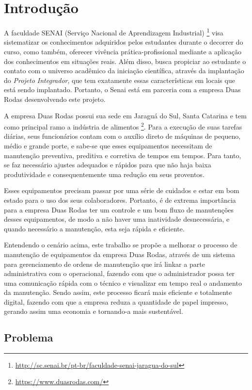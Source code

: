 \chapter{Introdução}

{A faculdade SENAI (Serviço Nacional de Aprendizagem Industrial) \footnote{\url{http://sc.senai.br/pt-br/faculdade-senai-jaragua-do-sul}}  visa sistematizar os conhecimentos adquiridos pelos estudantes durante o decorrer do curso, como também, oferecer vivência  prática-profissional mediante a aplicação dos conhecimentos em situações reais. Além disso, busca  propiciar ao estudante o contato com o universo acadêmico da iniciação científica, através da implantação do \textit{Projeto Integrador}, que tem exatamente essas características em locais que está sendo implantado. Portanto, o Senai está em parceria com a empresa Duas Rodas desenvolvendo este projeto. }

A empresa Duas Rodas possui sua sede em Jaraguá do Sul, Santa Catarina e tem como principal ramo a indústria de alimentos \footnote{\url{ https://www.duasrodas.com/}}. Para a execução de suas tarefas diárias, seus funcionários contam com o auxílio direto de máquinas de pequeno, médio e grande porte, e sabe-se que esses equipamentos necessitam de manutenção preventiva, preditiva e corretiva  de tempos em tempos. Para tanto, se faz necessário ajustes adequados e rápidos para que não haja baixa produtividade e consequentemente uma redução em seus proventos.

Esses equipamentos precisam passar por uma série de cuidados e estar em bom estado para o uso dos seus colaboradores. Portanto, é de extrema importância para a empresa Duas Rodas ter um controle e um bom fluxo de manutenções desses equipamentos, de modo a não haver uma inatividade desnecessária, e quando necessário a manutenção, esta seja rápida e eficiente.

Entendendo o cenário acima, este trabalho se propõe a melhorar o processo de manutenção de equipamentos da empresa Duas Rodas, através de um sistema para gerenciamento de ordens de manutenção que irá linkar a parte administrativa com o operacional, fazendo com que o administrador possa ter uma comunicação rápida com o técnico e visualizar em tempo real o andamento da manutenção. Sendo assim, este processo ficará mais eficiente e totalmente digital, fazendo com que a empresa reduza a quantidade de papel impresso, gerando assim uma economia e tornando-a mais sustentável.

\section{Problema}

